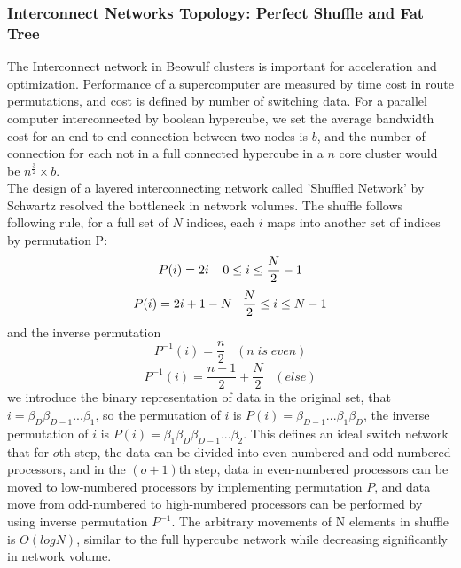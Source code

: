 \documentclass[11pt,openright,a4paper]{report}
\begin{document}
\subsubsection{Interconnect Networks Topology: Perfect Shuffle and Fat Tree}
The Interconnect network in Beowulf clusters is important for acceleration and optimization. Performance of a supercomputer are measured by time cost in route permutations, and cost is defined by number of switching data\cite{leiserson1985fat}. For a parallel computer interconnected by boolean hypercube, we set the average bandwidth cost for an end-to-end connection between two nodes is $b$, and the number of connection for each not in a full connected hypercube in a $n$ core cluster would be $n^{\frac{3}{2}} \times b $. \\
The design of a layered interconnecting network called 'Shuffled Network' by Schwartz resolved the bottleneck in network volumes\cite{stone1971parallel}. The shuffle follows following rule, for a full set of $N$ indices, each $i$ maps into another set of indices by permutation P: \\
\begin{equation}
\label{equa:2}
P(i)=2i\; \; \; \; 0\leq i \leq \frac{N}{2}-1\\
\end{equation}
\begin{equation}
\label{equa:3}
P(i)=2i+1-N\; \; \; \frac{N}{2}\leq i \leq N-1\\
\end{equation}
and the inverse permutation 
\begin{equation}
\label{equa:4}
P^{-1}(i)=\frac{n}{2}\; \; \; (n\; is\; even)
\end{equation}
\begin{equation}
\label{equa:5}
P^{-1}(i)=\frac{n-1}{2}+\frac{N}{2}\; \; \; (else)
\end{equation}
we introduce the binary representation of data in the original set, that $i=\beta_{D}\beta_{D-1}...\beta_{1}$, so the permutation of $i$ is $P(i)=\beta_{D-1}...\beta_{1}\beta_{D}$, the inverse permutation of $i$ is $P(i)=\beta_{1}\beta_{D}\beta_{D-1}...\beta_{2}$. This defines an ideal switch network that for $o$th step, the data can be divided into even-numbered and odd-numbered processors, and in the $(o+1)$th step, data in even-numbered processors can be moved to low-numbered processors by implementing permutation $P$, and data move from odd-numbered to high-numbered processors can be performed by using inverse permutation $P^{-1}$\cite{schwartz1980ultracomputers}. The arbitrary movements of N elements in shuffle is $O(logN)$, similar to the full hypercube network while decreasing significantly in network volume\cite{clos1953study}.\\
\end{document}
